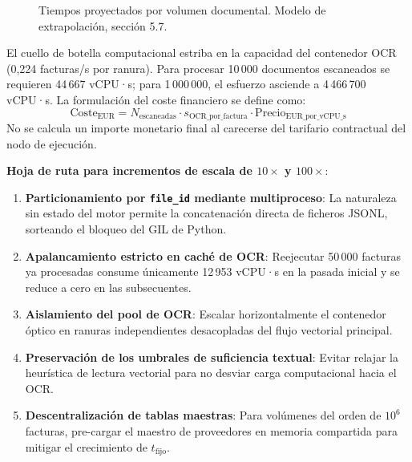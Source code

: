 \documentclass[11pt,a4paper]{article}
\begin{document}
\begin{figure}[htbp]
\centering
{}
\caption{Tiempos proyectados por volumen documental. Modelo de extrapolación, sección 5.7.}
\end{figure}

El cuello de botella computacional estriba en la capacidad del contenedor OCR (0,224 facturas/s por ranura). Para procesar 10\,000 documentos escaneados se requieren 44\,667 vCPU·s; para 1\,000\,000, el esfuerzo asciende a 4\,466\,700 vCPU·s. La formulación del coste financiero se define como:
$$\text{Coste}_{\text{EUR}} = N_{\text{escaneadas}} \cdot s_{\text{OCR\_por\_factura}} \cdot \text{Precio}_{\text{EUR\_por\_vCPU\_s}}$$
No se calcula un importe monetario final al carecerse del tarifario contractual del nodo de ejecución.

\textbf{Hoja de ruta para incrementos de escala de $10\times$ y $100\times$}:
\begin{enumerate}
    \item \textbf{Particionamiento por \texttt{file\_id} mediante multiproceso}: La naturaleza sin estado del motor permite la concatenación directa de ficheros JSONL, sorteando el bloqueo del GIL de Python.
    \item \textbf{Apalancamiento estricto en caché de OCR}: Reejecutar 50\,000 facturas ya procesadas consume únicamente 12\,953 vCPU·s en la pasada inicial y se reduce a cero en las subsecuentes.
    \item \textbf{Aislamiento del pool de OCR}: Escalar horizontalmente el contenedor óptico en ranuras independientes desacopladas del flujo vectorial principal.
    \item \textbf{Preservación de los umbrales de suficiencia textual}: Evitar relajar la heurística de lectura vectorial para no desviar carga computacional hacia el OCR.
    \item \textbf{Descentralización de tablas maestras}: Para volúmenes del orden de $10^6$ facturas, pre-cargar el maestro de proveedores en memoria compartida para mitigar el crecimiento de $t_{\text{fijo}}$.
\end{enumerate}
\end{document}
